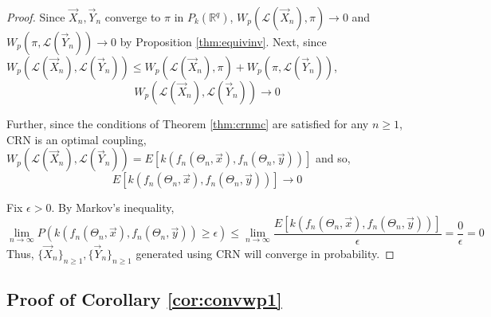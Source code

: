 \documentclass[12pt]{article}
\theoremstyle{plain}%
\theoremstyle{definition}
\begin{document}
\begin{proof}
	Since $\vec{X}_n,\vec{Y}_n$ converge to $\pi$ in $P_{k}(\mathbb{R}^q)$, $W_p(\mathcal{L}(\vec{X}_n),\pi)\to 0$ and $W_p(\pi, \mathcal{L}(\vec{Y}_n))\to 0$ by Proposition \ref{thm:equivinv}.
	Next, since $W_p(\mathcal{L}(\vec{X}_n),\mathcal{L}(\vec{Y}_n))\leq W_p(\mathcal{L}(\vec{X}_n),\pi) + W_p(\pi,\mathcal{L}(\vec{Y}_n))$, $$W_p(\mathcal{L}(\vec{X}_n),\mathcal{L}(\vec{Y}_n))\to 0$$
%	
%	
	
	
	Further, since the conditions of Theorem \ref{thm:crnmc} are satisfied for any $n\geq 1$, CRN is an optimal coupling, $W_p(\mathcal{L}(\vec{X}_n),\mathcal{L}(\vec{Y}_n)) = E[k(f_n(\Theta_n,\vec{x}),f_n(\Theta_n,\vec{y}))]$ and so, $$E[k(f_n(\Theta_n,\vec{x}),f_n(\Theta_n,\vec{y}))]\to 0$$
	
	
	Fix $\epsilon>0$. By Markov's inequality,
	\begin{equation*}
		\lim_{n\to\infty}P(k(f_n(\Theta_n,\vec{x}),f_n(\Theta_n,\vec{y}))\geq \epsilon)\leq \lim_{n\to\infty} \frac{E[k(f_n(\Theta_n,\vec{x}),f_n(\Theta_n,\vec{y}))]}{\epsilon}=\frac{0}{\epsilon}=0
	\end{equation*}
	Thus, $\{\vec{X}_n\}_{n\geq 1}, \{\vec{Y}_n\}_{n\geq 1}$ generated using CRN will converge in probability.
\end{proof}

\subsection{Proof of Corollary \ref{cor:convwp1}}\label{sec:convwp1}
\end{document}
